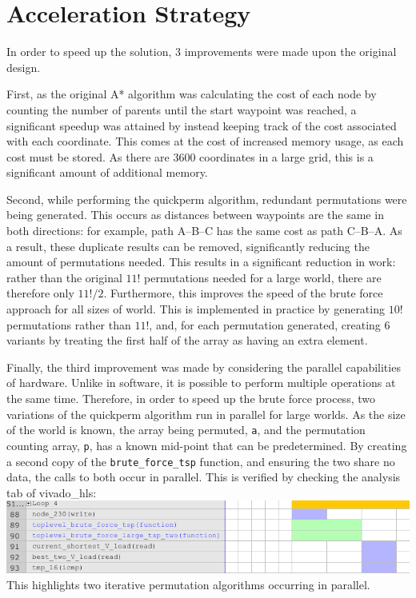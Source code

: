 \documentclass[a4paper, 11pt]{article}
\begin{document}


\section{Acceleration Strategy} %
In order to speed up the solution, 3 improvements were made upon the original design. 
\par\bigskip\noindent
First, as the original A* algorithm was calculating the cost of each node by 
counting the number of parents until the start waypoint was reached, a significant 
speedup was attained by instead keeping track of the cost associated with each 
coordinate. This comes at the cost of increased memory usage, as each cost must 
be stored. As there are 3600 coordinates in a large grid, this is a significant 
amount of additional memory. 
\par\bigskip\noindent
Second, while performing the quickperm algorithm, redundant permutations were being 
generated. This occurs as distances between waypoints are the same in both directions: 
for example, path A--B--C has the same cost as path C--B--A. As a result, these 
duplicate results can be removed, significantly reducing the amount of permutations 
needed. This results in a significant reduction in work: rather than the original 
$11!$ permutations needed for a large world, there are therefore only $11!/2$. 
Furthermore, this improves the speed of the brute force approach for all sizes of 
world. This is implemented in practice by generating $10!$ permutations rather than
$11!$, and, for each permutation generated, creating $6$ variants by treating the 
first half of the array as having an extra element. 
\par\bigskip\noindent
Finally, the third improvement was made by considering the parallel capabilities 
of hardware. Unlike in software, it is possible to perform multiple operations at 
the same time. Therefore, in order to speed up the brute force process, 
two variations of the quickperm algorithm run in parallel for large worlds. 
As the size of the world is known, the array being 
permuted, \texttt{a}, and the permutation counting array, \texttt{p}, has a known 
mid-point that can be predetermined. By creating a second copy of the 
\texttt{brute\_force\_tsp} function, and ensuring the two share no data, the calls 
to both occur in parallel. This is verified by checking the analysis tab of 
vivado\_hls:  \\
\includegraphics[width=\textwidth]{vivado_hls}
This highlights two iterative permutation algorithms occurring in parallel. 
\par\bigskip\noindent
\end{document}
